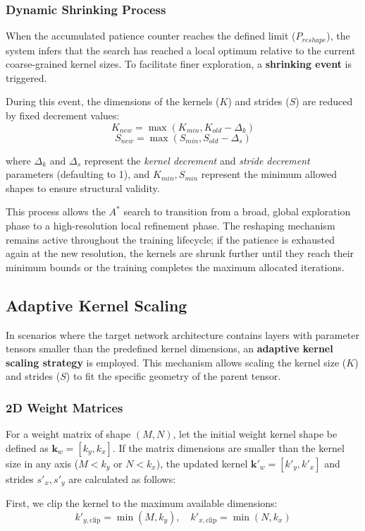 \subsubsection{Dynamic Shrinking Process}
When the accumulated patience counter reaches the defined limit ($P_{reshape}$), the system infers that the search has reached a local optimum relative to the current coarse-grained kernel sizes. To facilitate finer exploration, a \textbf{shrinking event} is triggered.

During this event, the dimensions of the kernels ($K$) and strides ($S$) are reduced by fixed decrement values:
$$ K_{new} = \max(K_{min}, K_{old} - \Delta_k) $$
$$ S_{new} = \max(S_{min}, S_{old} - \Delta_s) $$

where $\Delta_k$ and $\Delta_s$ represent the \textit{kernel decrement} and \textit{stride decrement} parameters (defaulting to 1), and $K_{min}, S_{min}$ represent the minimum allowed shapes to ensure structural validity.

This process allows the $A^*$ search to transition from a broad, global exploration phase to a high-resolution local refinement phase. The reshaping mechanism remains active throughout the training lifecycle; if the patience is exhausted again at the new resolution, the kernels are shrunk further until they reach their minimum bounds or the training completes the maximum allocated iterations.


\subsection{Adaptive Kernel Scaling}
In scenarios where the target network architecture contains layers with parameter tensors smaller than the predefined kernel dimensions, an \textbf{adaptive kernel scaling strategy} is employed. This mechanism allows scaling the kernel size ($K$) and strides ($S$) to fit the specific geometry of the parent tensor.

\subsubsection{2D Weight Matrices}
For a weight matrix of shape $(M, N)$, let the initial weight kernel shape be defined as $\mathbf{k}_w = [k_y, k_x]$. If the matrix dimensions are smaller than the kernel size in any axis ($M < k_y$ or $N < k_x$), the updated kernel $\mathbf{k}'_w = [k'_y, k'_x]$ and strides $s'_x, s'_y$ are calculated as follows:

First, we clip the kernel to the maximum available dimensions:
$$ k'_{y, \text{clip}} = \min(M, k_y), \quad k'_{x, \text{clip}} = \min(N, k_x) $$

